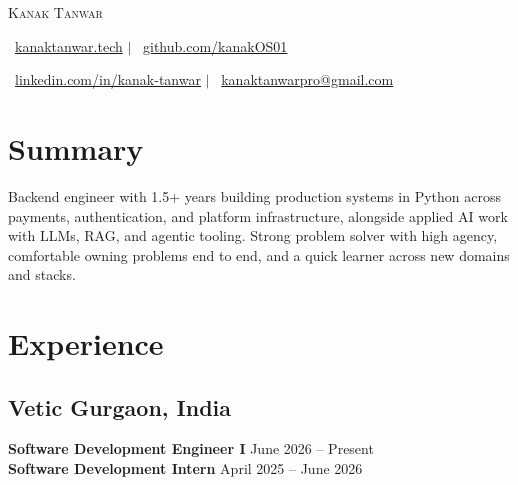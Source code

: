 \documentclass[a4paper,11pt]{article}
\begin{document}
\pagestyle{empty}

\vspace*{\fill}
\vspace{-10mm}
\begin{center}
    {\Huge\scshape Kanak Tanwar}

    \vspace{0.01em}
    \faGlobe\ \href{https://kanaktanwar.tech}{kanaktanwar.tech} $\vert$
    \faGithub\ \href{https://github.com/kanakOS01}{github.com/kanakOS01}
    
    \faLinkedin\ \href{https://www.linkedin.com/in/kanak-tanwar/}{linkedin.com/in/kanak-tanwar} $\vert$
    \faEnvelope\ \href{mailto:kanaktanwarpro@gmail.com}{kanaktanwarpro@gmail.com}
\end{center}
\vspace{-8mm}

\section*{Summary}
\vspace{-1mm}
\noindent Backend engineer with 1.5+ years building production systems in Python across payments, authentication,
and platform infrastructure, alongside applied AI work with LLMs, RAG, and agentic tooling. Strong problem solver
with high agency, comfortable owning problems end to end, and a quick learner across new domains and stacks.
\vspace{-4mm}

\section*{Experience}
\vspace{-2mm}

\subsection*{Vetic \hfill \textnormal{Gurgaon, India}}
\noindent\textbf{Software Development Engineer I} \hfill June 2026 -- Present\\
\noindent\textbf{Software Development Intern} \hfill April 2025 -- June 2026
\end{document}
